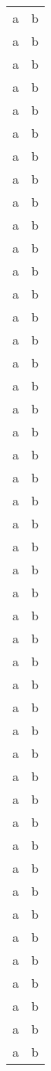 \documentclass[12pt]{article}
\begin{document}
\begin{multicols}{2}
\begin{tabular}{c|c}
     a & b \\
     a & b \\
     a & b \\
     a & b \\
     a & b \\
     a & b \\
     a & b \\
     a & b \\a & b \\
     a & b \\
     a & b \\
     a & b \\
     a & b \\
     a & b \\
     a & b \\
     a & b \\
     a & b \\
     a & b \\
     a & b \\
     a & b \\
     a & b \\
     a & b \\
     a & b \\
     a & b \\
     a & b \\
     a & b \\
     a & b \\
     a & b \\
     a & b \\
     a & b \\
     a & b \\
     a & b \\
     a & b \\
     a & b \\
     a & b \\
     a & b \\
     a & b \\
     a & b \\
     a & b \\
     a & b \\
     a & b \\
     a & b \\
     a & b \\
     a & b \\
     a & b \\
     a & b \\

\end{tabular}
\end{multicols}
\end{document}

